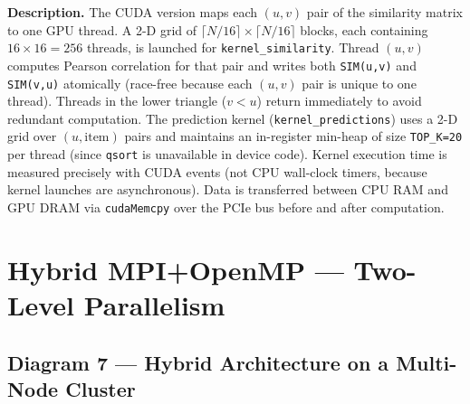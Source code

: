 \documentclass[12pt,a4paper]{article}
\begin{document}
\begin{mdframed}[style=descbox]
\textbf{Description.}  The CUDA version maps each $(u,v)$ pair of the
similarity matrix to one GPU thread.  A 2-D grid of $\lceil N/16 \rceil
\times \lceil N/16 \rceil$ blocks, each containing $16 \times 16 = 256$
threads, is launched for \texttt{kernel\_similarity}.  Thread $(u,v)$ computes
Pearson correlation for that pair and writes both \texttt{SIM(u,v)} and
\texttt{SIM(v,u)} atomically (race-free because each $(u,v)$ pair is unique
to one thread).  Threads in the lower triangle ($v < u$) return immediately
to avoid redundant computation.  The prediction kernel (\texttt{kernel\_predictions})
uses a 2-D grid over $(u, \text{item})$ pairs and maintains an in-register
min-heap of size \texttt{TOP\_K=20} per thread (since \texttt{qsort} is
unavailable in device code).  Kernel execution time is measured precisely
with CUDA events (not CPU wall-clock timers, because kernel launches are
asynchronous).  Data is transferred between CPU RAM and GPU DRAM via
\texttt{cudaMemcpy} over the PCIe bus before and after computation.
\end{mdframed}

\newpage

\section{Hybrid MPI+OpenMP — Two-Level Parallelism}

\subsection*{Diagram 7 — Hybrid Architecture on a Multi-Node Cluster}
\end{document}
